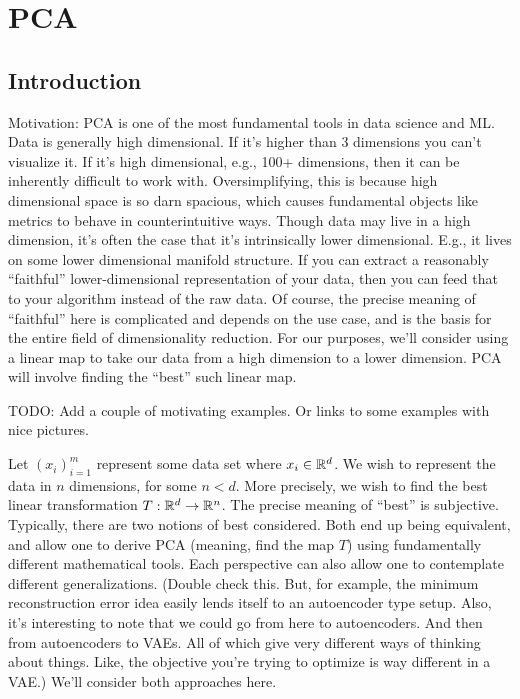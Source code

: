 \chapter{PCA}
\section{Introduction}
Motivation: PCA is one of the most fundamental tools in data science and ML. Data is generally high dimensional. If it's higher than 3 dimensions you can't visualize it. If it's high dimensional, e.g., 100+ dimensions, then it can be inherently difficult to work with. Oversimplifying, this is because high dimensional space is so darn spacious, which causes fundamental objects like metrics to behave in counterintuitive ways. Though data may live in a high dimension, it's often the case that it's intrinsically lower dimensional. E.g., it lives on some lower dimensional manifold structure. If you can extract a reasonably ``faithful'' lower-dimensional representation of your data, then you can feed that to your algorithm instead of the raw data. Of course, the precise meaning of ``faithful'' here is complicated and depends on the use case, and is the basis for the entire field of dimensionality reduction. For our purposes, we'll consider using a linear map to take our data from a high dimension to a lower dimension. PCA will involve finding the ``best'' such linear map. 

TODO: Add a couple of motivating examples. Or links to some examples with nice pictures. 

Let $(x_i)_{i=1}^m$ represent some data set where $x_i \in \mathbb{R}^d$. We wish to represent the data in $n$ dimensions, for some $n<d$. More precisely, we wish to find the best linear transformation $T:\mathbb{R}^d\to\mathbb{R}^n$. The precise meaning of ``best'' is subjective. Typically, there are two notions of best considered. Both end up being equivalent, and allow one to derive PCA (meaning, find the map $T$) using fundamentally different mathematical tools. Each perspective can also allow one to contemplate different generalizations. (Double check this. But, for example, the minimum reconstruction error idea easily lends itself to an autoencoder type setup. Also, it's interesting to note that we could go from here to autoencoders. And then from autoencoders to VAEs. All of which give very different ways of thinking about things. Like, the objective you're trying to optimize is way different in a VAE.) We'll consider both approaches here. 

